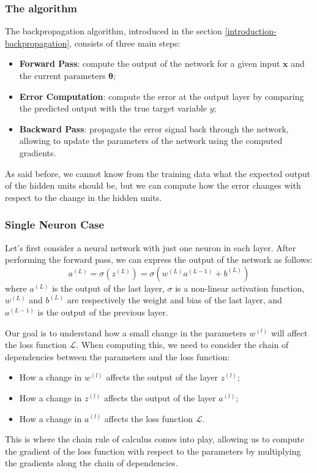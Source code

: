 \subsubsection{The algorithm}
The backpropagation algorithm, introduced in the section \ref{introduction-backpropagation}, consists of three main steps:
\begin{itemize}
    \item \textbf{Forward Pass}: compute the output of the network for a given input $\boldsymbol{x}$ and the current parameters $\boldsymbol{\theta}$;
    \item \textbf{Error Computation}: compute the error at the output layer by comparing the predicted output with the true target variable $y$;
    \item \textbf{Backward Pass}: propagate the error signal back through the network, allowing to update the parameters of the network using the computed gradients.
\end{itemize}
As said before, we cannot know from the training data what the expected output of the hidden units should be, but we can compute how
the error changes with respect to the change in the hidden units.

\subsubsection{Single Neuron Case}
Let's first consider a neural network with just one neuron in each layer.
After performing the forward pass, we can express the output of the network as follows:
\begin{equation*}
    a^{(L)} = \sigma(z^{(L)}) = \sigma(w^{(L)} a^{(L-1)} + b^{(L)})
\end{equation*}
where $a^{(L)}$ is the output of the last layer, $\sigma$ is a non-linear activation function, 
$w^{(L)}$ and $b^{(L)}$ are respectively the weight and bias of the last layer, and $a^{(L-1)}$ is the output of the previous layer.

Our goal is to understand how a small change in the parameters $w^{(l)}$ will affect the loss function $\mathcal{L}$.
When computing this, we need to consider the chain of dependencies between the parameters and the loss function:
\begin{itemize}
    \item How a change in $w^{(l)}$ affects the output of the layer $z^{(l)}$;
    \item How a change in $z^{(l)}$ affects the output of the layer $a^{(l)}$;
    \item How a change in $a^{(l)}$ affects the loss function $\mathcal{L}$.
\end{itemize}
This is where the chain rule of calculus comes into play, allowing us to compute the gradient of the 
loss function with respect to the parameters by multiplying the gradients along the chain of dependencies.

